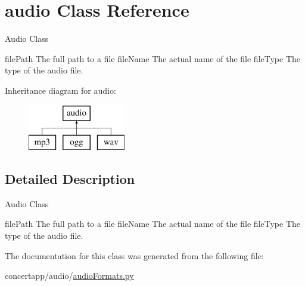 \hypertarget{classaudio}{
\section{audio Class Reference}
\label{classaudio}
}


Audio Class

filePath The full path to a file fileName The actual name of the file fileType The type of the audio file.  


Inheritance diagram for audio:\begin{figure}[H]
\begin{center}
\leavevmode
\includegraphics[height=2.000000cm]{classaudio}
\end{center}
\end{figure}


\subsection{Detailed Description}
Audio Class

filePath The full path to a file fileName The actual name of the file fileType The type of the audio file. 

The documentation for this class was generated from the following file:\begin{DoxyCompactItemize}
\item 
concertapp/audio/\hyperlink{audio_formats_8py}{audioFormats.py}\end{DoxyCompactItemize}
